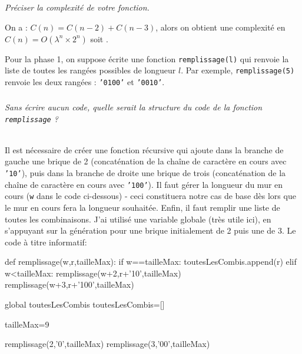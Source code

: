 \subparagraph{}\textit{Préciser la complexité de votre fonction.}
\ifprof
\begin{corrige}
On a : $C(n)=C(n-2)+C(n-3)$, alors on obtient une complexité en $C(n)=O\left(\lambda^n \times 2^{n}\right)$ soit .

\end{corrige}
\else
\fi
Pour la phase 1, on suppose écrite une fonction \texttt{remplissage(l)} qui renvoie la liste de toutes les rangées possibles de longueur $l$. Par exemple, \texttt{remplissage(5)} renvoie les deux rangées : \texttt{'0100'} et \texttt{'0010'}.









\subparagraph{}\textit{Sans écrire aucun code, quelle serait la structure du code de la fonction \texttt{remplissage} ?}


\ifprof
\begin{corrige}~\\
Il est nécessaire de créer une fonction récursive qui ajoute dans la branche de gauche une brique de 2 (concaténation de la chaîne de caractère en cours avec \texttt{'10'}), puis dans la branche de droite une brique de trois (concaténation de la chaîne de caractère en cours avec \texttt{'100'}). Il faut gérer la longueur du mur en cours (\texttt{w} dans le code ci-dessous) - ceci constituera notre cas de base dès lors que le mur en cours fera la longueur souhaitée. Enfin, il faut remplir une liste de toutes les combinaisons. J'ai utilisé une variable globale (très utile ici), en s'appuyant sur la génération pour une brique initialement de 2 puis une de 3. Le code à titre informatif:

\begin{python}
def remplissage(w,r,tailleMax):
    if w==tailleMax:
        toutesLesCombis.append(r)
    elif w<tailleMax:
        remplissage(w+2,r+'10',tailleMax)
        remplissage(w+3,r+'100',tailleMax)
        
global toutesLesCombis
toutesLesCombis=[]

tailleMax=9
      
remplissage(2,'0',tailleMax)
remplissage(3,'00',tailleMax)
\end{python}
 \end{corrige}
\else
\fi

